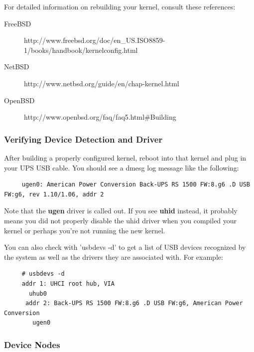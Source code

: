 For detailed information on rebuilding your kernel, consult these references: 

\begin{description}
\item [FreeBSD]
      {http://www.freebsd.org/doc/en\_US.ISO8859-1/books/handbook/kernelconfig.html}
\item [NetBSD]
      {http://www.netbsd.org/guide/en/chap-kernel.html}
\item [OpenBSD]
      {http://www.openbsd.org/faq/faq5.html\#Building}
\end{description}

\subsubsection*{Verifying Device Detection and Driver}

After building a properly configured kernel, reboot into that kernel and plug
in your UPS USB cable. You should see a dmesg log message like the following: 

\begin{verbatim}
     ugen0: American Power Conversion Back-UPS RS 1500 FW:8.g6 .D USB FW:g6, rev 1.10/1.06, addr 2
\end{verbatim}

Note that the {\bf ugen} driver is called out. If you see {\bf uhid} instead, it
probably means you did not properly disable the uhid driver when you compiled
your kernel or perhaps you're not running the new kernel.

You can also check with 'usbdevs -d' to get a list of USB devices recognized
by the system as well as the drivers they are associated with. For example: 

\begin{verbatim}
     # usbdevs -d
     addr 1: UHCI root hub, VIA
       uhub0
      addr 2: Back-UPS RS 1500 FW:8.g6 .D USB FW:g6, American Power Conversion
        ugen0
\end{verbatim}

\subsubsection*{Device Nodes}

